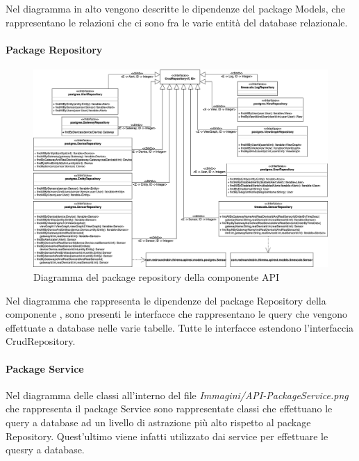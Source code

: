 		Nel diagramma in alto vengono descritte le dipendenze del package Models, che rappresentano le relazioni che ci sono fra le varie entità del database relazionale. 
		\begin{landscape}
		\paragraph*{Package Repository}
		\begin{figure}[H]
			\centering
			\includegraphics[scale=0.500]{res/images/API/RepositoryPackage.png}
			\caption{Diagramma del package repository della componente API}
			\label{Diagramma 15}
		\end{figure}
		Nel diagramma che rappresenta le dipendenze del package Repository della componente , sono presenti le interfacce che rappresentano le query che vengono effettuate a database nelle varie tabelle. Tutte le interfacce estendono l'interfaccia CrudRepository.
		\paragraph*{Package Service}
		Nel diagramma delle classi all'interno del file \textit{Immagini/API-PackageService.png} che rappresenta il package Service sono rappresentate classi che effettuano le query a database ad un livello di astrazione più alto rispetto al package Repository. Quest'ultimo viene infatti utilizzato dai service per effettuare le quesry a database.
	

\end{landscape}
